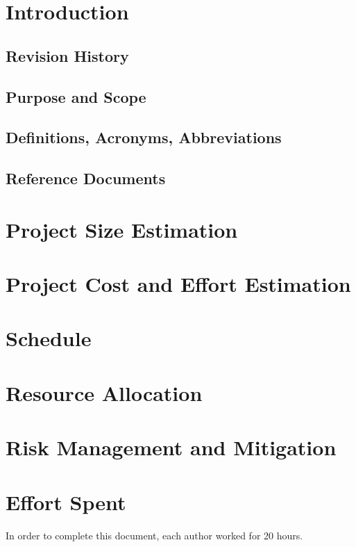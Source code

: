 \documentclass[11pt,a4paper]{report}
\begin{document}


\thispagestyle{empty}
\tableofcontents
\listoffigures
\cleardoublepage
{}
\pagestyle{fancy}

\chapter{Introduction}
\section{Revision History}
\section{Purpose and Scope}
\section{Definitions, Acronyms, Abbreviations}
\section{Reference Documents}
\chapter{Project Size Estimation}
\chapter{Project Cost and Effort Estimation}
\chapter{Schedule}
\chapter{Resource Allocation}
\chapter{Risk Management and Mitigation}
\chapter{Effort Spent}
In order to complete this document, each author worked for 20 hours.
\end{document}
